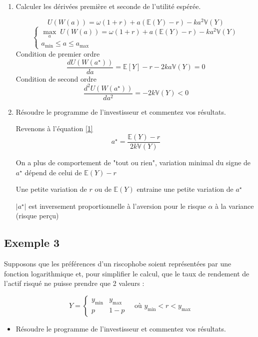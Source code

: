 \documentclass[a4paper, 12pt]{report}
\begin{document}
\begin{enumerate}
	\item Calculer les dérivées première et seconde de l'utilité espérée.
	
\[ U(W(a)) =  \omega(1+r)+a(\mathbb{E}(Y)-r) - ka^2 \mathbb{V}(Y) \]	
\[
\begin{cases}
	\underset{a}\max \; U(W(a)) = \omega(1+r)+a(\mathbb{E}(Y)-r) - ka^2 \mathbb{V}(Y) \\
	a_{\text{min}} \leq a \leq a_{\text{max}}
\end{cases}
\]
Condition de premier ordre 
\[
\frac{d U(W(a^{\star}))}{da} = \mathbb{E}[Y] - r -2ka \mathbb{V}(Y)= 0 \tag{1}\label{1}
\] 
Condition de second ordre
\[
\frac{d^2 U(W(a^{\star}))}{da^2} = -2k \mathbb{V}(Y)< 0 
\]

	\item Résoudre le programme de l'investisseur et commentez vos résultats.

\noindent
Revenons à l'équation \ref{1}
\[ a^{\star}=\frac{\mathbb{E}(Y)-r}{2k\mathbb{V}(Y)} \]

On a plus de comportement de "tout ou rien", variation minimal du signe de \( a^{\star} \) dépend de celui de \( \mathbb{E}(Y)-r \)

Une petite variation de \( r \) ou de \( \mathbb{E}(Y) \) entraine une petite variation de \( a^{\star} \)

\( \left| a^{\star} \right|\)  est inversement proportionnelle à l'aversion pour le risque \( \alpha \) à la variance (risque perçu)

\end{enumerate}

\subsection{Exemple 3}

Supposons que les préférences d'un riscophobe soient représentées par une fonction logarithmique et, pour simplifier le calcul, que le taux de rendement de l'actif risqué ne puisse prendre que 2 valeurs :

\[
Y = 
\begin{cases} 
	y_{\min} & y_{\max}  \\ 
p	 &  1 - p 
\end{cases} 
\quad \text{où } y_{\min} < r < y_{\max}
\]

\begin{itemize}
	\item Résoudre le programme de l'investisseur et commentez vos résultats.
\end{itemize}
\end{document}
